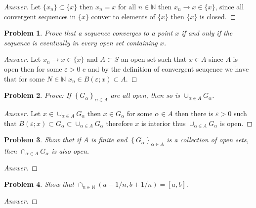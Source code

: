\documentclass{article}
\newtheorem{problem}{Problem}
\begin{document}
\begin{proof}[Answer]
    Let $\{x_n\}\subset \{x\}$ then $x_n = x$ for all $n\in \mathbb{N}$ then $x_n\to x\in \{x\}$, since all convergent sequences in $\{ x\}$ conver to elements of $\{ x\}$ then $\{ x\}$ is closed.
\end{proof}

\begin{problem}
Prove that a sequence converges to a point $x$ if and only if the sequence is eventually in every open set containing $x$.
\end{problem}

\begin{proof}[Answer]
    Let $x_n\to x\in \{x\}$ and $A\subset S$ an open set such that $x\in A$ since $A$ is open then for some $\varepsilon>0$ c and by the definition of convergent seuqence we have that for some $N\in \mathbb{N}$ $x_n\in B(\varepsilon;x)\subset A$.
\end{proof}

\begin{problem}
Prove: If $\left\{G_{\alpha}\right\}_{\alpha \in A}$ are all open, then so is $\cup_{\alpha \in A} G_{\alpha}$.
\end{problem}

\begin{proof}[Answer]
    Let $x\in \cup_{\alpha \in A} G_{\alpha}$ then $x\in G_\alpha$ for some $\alpha \in A$ then there is $\varepsilon >0 $ such that $B(\varepsilon; x)\subset G_\alpha \subset \cup_{\alpha \in A} G_{\alpha}$ therefore $x$ is interior thus $\cup_{\alpha \in A} G_{\alpha}$ is open.
\end{proof}

\begin{problem}
Show that if $A$ is finite and $\left\{G_{\alpha}\right\}_{\alpha \in A}$ is a collection of open sets, then $\cap_{\alpha \in A} G_{\alpha}$ is also open.
\end{problem}

\begin{proof}[Answer]
    
\end{proof}

\begin{problem}
Show that $\cap_{n \in \mathbb{N}}(a-1 / n, b+1 / n)=[a, b]$.
\end{problem}

\begin{proof}[Answer]
    
\end{proof}
\end{document}
